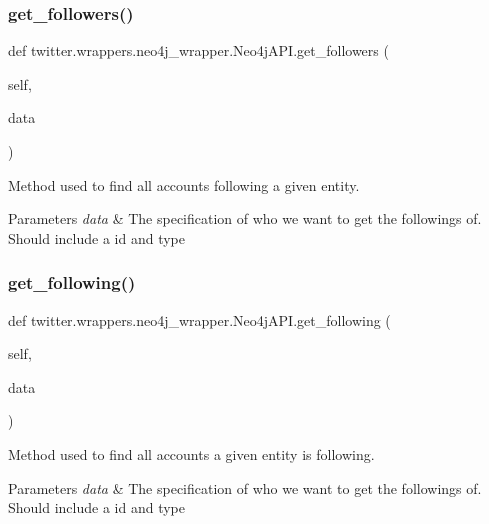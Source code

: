 \subsubsection{\texorpdfstring{get\+\_\+followers()}{get\_followers()}}
{\footnotesize\ttfamily def twitter.\+wrappers.\+neo4j\+\_\+wrapper.\+Neo4j\+A\+P\+I.\+get\+\_\+followers (\begin{DoxyParamCaption}\item[{}]{self,  }\item[{}]{data }\end{DoxyParamCaption})}



Method used to find all accounts following a given entity. 


\begin{DoxyParams}{Parameters}
{\em data} & The specification of who we want to get the followings of. Should include a id and type \\
\hline
\end{DoxyParams}
\mbox{\label{classtwitter_1_1wrappers_1_1neo4j__wrapper_1_1Neo4jAPI_afe328bc3bff856511ffe291bf6e94e8e}} 
\subsubsection{\texorpdfstring{get\+\_\+following()}{get\_following()}}
{\footnotesize\ttfamily def twitter.\+wrappers.\+neo4j\+\_\+wrapper.\+Neo4j\+A\+P\+I.\+get\+\_\+following (\begin{DoxyParamCaption}\item[{}]{self,  }\item[{}]{data }\end{DoxyParamCaption})}



Method used to find all accounts a given entity is following. 


\begin{DoxyParams}{Parameters}
{\em data} & The specification of who we want to get the followings of. Should include a id and type \\
\hline
\end{DoxyParams}
\mbox{\label{classtwitter_1_1wrappers_1_1neo4j__wrapper_1_1Neo4jAPI_a94d7463864ce54f396cef3b256825f60}} 
